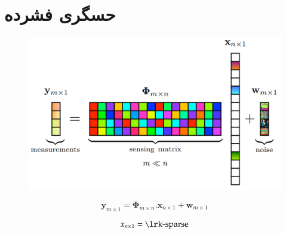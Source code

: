 \FloatBarrier
\section{حسگری فشرده}\label{ch:background|sec:compresed-sensing}



\begin{figure}[t!]
	\centering
	\includegraphics[width=0.7\linewidth]{chapters/chapter-2/figs/compressed-sensig-general-settings}
	\caption{}
	\label{fig:compressed-sensig-general-settings}
\end{figure}


\removevspace
\begin{equation}
	\mathbf{y}_{m\times1} = \mathbf{\Phi}_{m\times n} . \mathbf{x}_{n\times1} + \mathbf{w}_{m\times1}
\end{equation}

\[x_{n\times1} = \lrtext{k-sparse}\]






